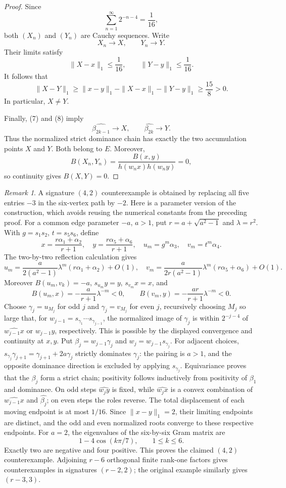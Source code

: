 \documentclass[11pt,reqno]{amsart}
\theoremstyle{plain}
\theoremstyle{definition}
\theoremstyle{remark}
\newtheorem{remark}[theorem]{Remark}
\numberwithin{equation}{section}
\begin{document}
\begin{proof}
Since
\[
\sum_{n=1}^{\infty}2^{-n-4}=\frac1{16},
\]
both $(X_n)$ and $(Y_n)$ are Cauchy sequences. Write
\[
X_n\longrightarrow X,\qquad Y_n\longrightarrow Y.
\]
Their limits satisfy
\[
\|X-x\|_1\leq\frac1{16},
\qquad
\|Y-y\|_1\leq\frac1{16}.
\]
It follows that
\[
\|X-Y\|_1
\geq\|x-y\|_1-\|X-x\|_1-\|Y-y\|_1
\geq\frac{15}{8}>0.
\]
In particular, $X\neq Y$.

Finally, (7) and (8) imply
\[
\widehat{\beta_{2k-1}}\longrightarrow X,
\qquad
\widehat{\beta_{2k}}\longrightarrow Y.
\]
Thus the normalized strict dominance chain has exactly the two
accumulation points $X$ and $Y$. Both belong to $E$. Moreover,
\[
B(X_n,Y_n)
=\frac{B(x,y)}{h(w_nx)h(w_ny)}=0,
\]
so continuity gives $B(X,Y)=0$.
\end{proof}
\begin{remark}\label{rem:42-counterexample}
A signature $(4,2)$ counterexample is obtained by replacing all five entries $-3$ in the six-vertex path by $-2$. Here is a parameter version of the construction, which avoids reusing the numerical constants from the preceding proof.
For a common edge parameter $-a$, $a>1$, put $r=a+\sqrt{a^2-1}$ and $\lambda=r^2$. With $g=s_1s_2$, $t=s_5s_6$, define
\[
 x=\frac{r\alpha_1+\alpha_2}{r+1},\quad
 y=\frac{r\alpha_5+\alpha_6}{r+1},\quad
 u_m=g^m\alpha_3,\quad v_m=t^m\alpha_4.
\]
The two-by-two reflection calculation gives
\[
 u_m=\frac{a}{2(a^2-1)}\lambda^m(r\alpha_1+\alpha_2)+O(1),\quad
 v_m=\frac{a}{2r(a^2-1)}\lambda^m(r\alpha_5+\alpha_6)+O(1).
\]
Moreover $B(u_m,v_k)=-a$, $s_{u_m}y=y$, $s_{v_m}x=x$, and
\[
 B(u_m,x)=-\frac{a}{r+1}\lambda^{-m}<0,\qquad
 B(v_m,y)=-\frac{ar}{r+1}\lambda^{-m}<0.
\]
Choose $\gamma_j=u_{M_j}$ for odd $j$ and $\gamma_j=v_{M_j}$ for even $j$, recursively choosing $M_j$ so large that, for $w_{j-1}=s_{\gamma_1}\cdots s_{\gamma_{j-1}}$, the normalized image of $\gamma_j$ is within $2^{-j-4}$ of $\widehat{w_{j-1}x}$ or $\widehat{w_{j-1}y}$, respectively. This is possible by the displayed convergence and continuity at $x,y$. Put $\beta_j=w_{j-1}\gamma_j$ and $w_j=w_{j-1}s_{\gamma_j}$.
For adjacent choices, $s_{\gamma_j}\gamma_{j+1}=\gamma_{j+1}+2a\gamma_j$ strictly dominates $\gamma_j$: the pairing is $a>1$, and the opposite dominance direction is excluded by applying $s_{\gamma_j}$. Equivariance proves that the $\beta_j$ form a strict chain; positivity follows inductively from positivity of $\beta_1$ and dominance. On odd steps $\widehat{w_jy}$ is fixed, while $\widehat{w_jx}$ is a convex combination of $\widehat{w_{j-1}x}$ and $\widehat{\beta_j}$; on even steps the roles reverse. The total displacement of each moving endpoint is at most $1/16$. Since $\|x-y\|_1=2$, their limiting endpoints are distinct, and the odd and even normalized roots converge to these respective endpoints.
For $a=2$, the eigenvalues of the six-by-six Gram matrix are
\[
 1-4\cos(k\pi/7),\qquad 1\leq k\leq6.
\]
Exactly two are negative and four positive. This proves the claimed $(4,2)$ counterexample. Adjoining $r-6$ orthogonal finite rank-one factors gives counterexamples in signatures $(r-2,2)$; the original example similarly gives $(r-3,3)$.
\end{remark}
\end{document}
